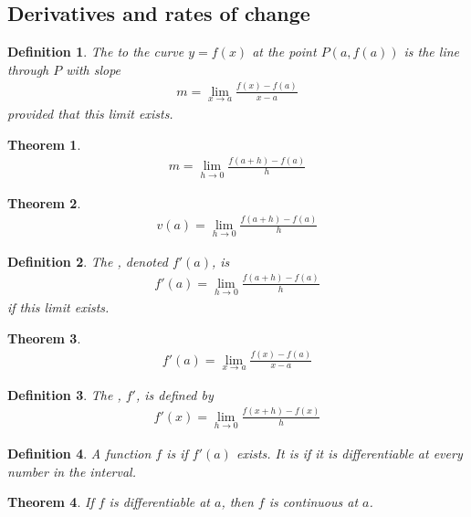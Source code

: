 \documentclass{article}
\theoremstyle{sltheorem}
\newtheorem{definition}{Definition}[section]
\newtheorem{theorem}{Theorem}[section]
\begin{document}
\subsection{Derivatives and rates of change}
\begin{definition}
    The  to the curve $y=f(x)$ at the point $P(a, f(a))$ is the line through $P$ with slope
    \begin{align*}
        m=\lim_{x\to a}\frac{f(x)-f(a)}{x-a}
    \end{align*}
    provided that this limit exists.
\end{definition}
\begin{theorem}
    \begin{align*}
        m=\lim_{h\to 0}\frac{f(a + h)-f(a)}{h}
    \end{align*}
\end{theorem}
\begin{theorem}
    \begin{align*}
        v(a)=\lim_{h\to 0}\frac{f(a+h)-f(a)}{h}
    \end{align*}
\end{theorem}
\begin{definition}
    The , denoted $f'(a)$, is
    \begin{align*}
        f'(a)=\lim_{h\to 0}\frac{f(a+h)-f(a)}{h}
    \end{align*}
    if this limit exists.
\end{definition}
\begin{theorem}
    \begin{align*}
        f'(a)=\lim_{x\to a}\frac{f(x)-f(a)}{x-a}
    \end{align*}
\end{theorem}
\begin{definition}
    The , $f'$, is defined by
    \begin{align*}
        f'(x)=\lim_{h\to 0}\frac{f(x+h)-f(x)}{h}
    \end{align*}
\end{definition}
\begin{definition}
    A function $f$ is  if $f'(a)$ exists. It is  if it is differentiable at every number in the interval.
\end{definition}
\begin{theorem}
    If $f$ is differentiable at $a$, then $f$ is continuous at $a$.
\end{theorem}
\end{document}
